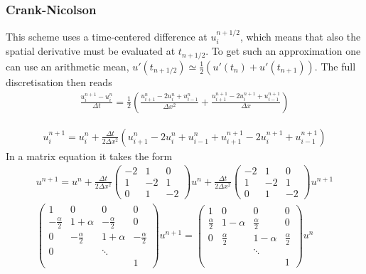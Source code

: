 \documentclass[11pt,a4paper,final]{article}
\numberwithin{equation}{section}
\begin{document}
\subsubsection{Crank-Nicolson}
This scheme uses a time-centered difference at $u_i^{n+1/2}$, which means that also the spatial derivative must be evaluated at $t_{n+1/2}$. To get such an approximation one can use an arithmetic mean, $u'(t_{n+1/2}) \simeq \frac{1}{2}(u'(t_{n}) + u'(t_{n+1}))$. The full discretisation then reads 
\begin{gather}
\frac{u_{i}^{n+1}-u_{i}^{n}}{\Delta t} = \frac{1}{2} \left( \frac{u_{i+1}^{n} -2 u_{i}^{n}+u_{i-1}^{n}}{\Delta x^2} + \frac{u_{i+1}^{n+1} -2u_{i}^{n+1}+u_{i-1}^{n+1} }{\Delta x} \right)
\end{gather}


\begin{gather}
u_i^{n+1} = u_i^n + \frac{\Delta t}{2\Delta x^2}\left(
u_{i+1}^n - 2u_i^n + u_{i-1}^n + u_{i+1}^{n+1} - 2u_i^{n+1} + u_{i-1}^{n+1}
\right)
\end{gather}
In a matrix equation it takes the form
\begin{gather}
u^{n+1} = u^n + \frac{\Delta t}{2\Delta x^2}
\begin{pmatrix}
-2 & 1 & 0\\
1 & -2 & 1\\
0 & 1 & -2
\end{pmatrix} u^n
 + \frac{\Delta t}{2\Delta x^2}
\begin{pmatrix}
-2 & 1 & 0\\
1 & -2 & 1\\
0 & 1 & -2
\end{pmatrix}u^{n+1}\\
\begin{pmatrix}
1 & 0 & 0 & 0\\
-\frac{\alpha}{2} & 1 + \alpha & -\frac{\alpha}{2} & 0\\
0 & -\frac{\alpha}{2} & 1 + \alpha & -\frac{\alpha}{2}\\
0 & & \ddots\\
&&& 1
\end{pmatrix}
u^{n+1} = 
\begin{pmatrix}
1 & 0 & 0 & 0\\
\frac{\alpha}{2} & 1 - \alpha & \frac{\alpha}{2} &  0\\
0 & \frac{\alpha}{2} & 1 - \alpha & \frac{\alpha}{2}\\
&& \ddots\\
&&&1
\end{pmatrix}u^n
\end{gather}
\end{document}
